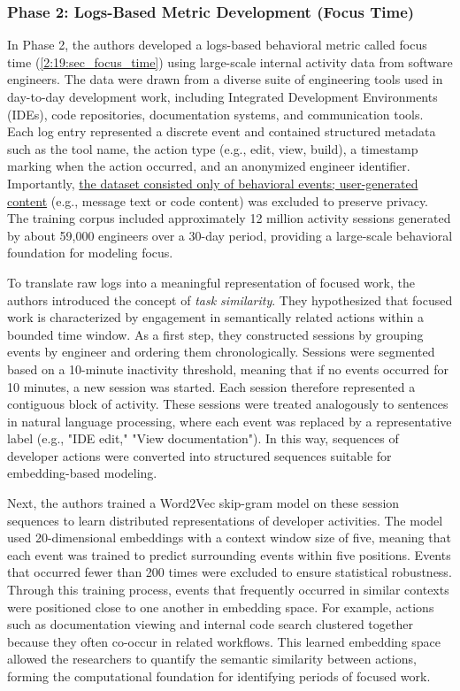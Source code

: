 \subsubsection{Phase 2: Logs-Based Metric Development (Focus Time)}
In Phase 2, the authors developed a logs-based behavioral metric called focus time (\ref{2:19:sec_focus_time}) using large-scale internal activity data from software engineers. The data were drawn from a diverse suite of engineering tools used in day-to-day development work, including Integrated Development Environments (IDEs), code repositories, documentation systems, and communication tools. Each log entry represented a discrete event and contained structured metadata such as the tool name, the action type (e.g., edit, view, build), a timestamp marking when the action occurred, and an anonymized engineer identifier. Importantly, \underline{the dataset consisted only of behavioral events; user-generated content} (e.g., message text or code content) was excluded to preserve privacy. The training corpus included approximately 12 million activity sessions generated by about 59,000 engineers over a 30-day period, providing a large-scale behavioral foundation for modeling focus.

To translate raw logs into a meaningful representation of focused work, the authors introduced the concept of \textit{task similarity}. They hypothesized that focused work is characterized by engagement in semantically related actions within a bounded time window. As a first step, they constructed sessions by grouping events by engineer and ordering them chronologically. Sessions were segmented based on a 10-minute inactivity threshold, meaning that if no events occurred for 10 minutes, a new session was started. Each session therefore represented a contiguous block of activity. These sessions were treated analogously to sentences in natural language processing, where each event was replaced by a representative label (e.g., "IDE edit," "View documentation"). In this way, sequences of developer actions were converted into structured sequences suitable for embedding-based modeling.

Next, the authors trained a Word2Vec skip-gram model on these session sequences to learn distributed representations of developer activities. The model used 20-dimensional embeddings with a context window size of five, meaning that each event was trained to predict surrounding events within five positions. Events that occurred fewer than 200 times were excluded to ensure statistical robustness. Through this training process, events that frequently occurred in similar contexts were positioned close to one another in embedding space. For example, actions such as documentation viewing and internal code search clustered together because they often co-occur in related workflows. This learned embedding space allowed the researchers to quantify the semantic similarity between actions, forming the computational foundation for identifying periods of focused work.

